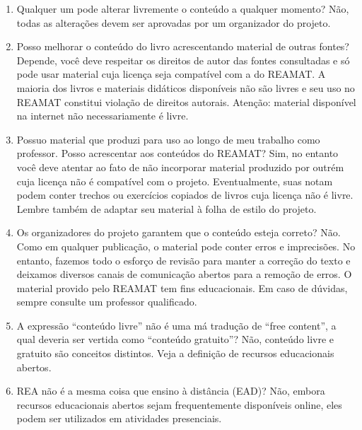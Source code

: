 \documentclass[12pt]{report}
\begin{document}
\begin{enumerate}
\item Qualquer um pode alterar livremente o conteúdo a qualquer momento?
Não, todas as alterações devem ser aprovadas por um organizador do projeto.

\item Posso melhorar o conteúdo do livro acrescentando material de outras fontes?
Depende, você deve respeitar os direitos de autor das fontes consultadas e só pode usar material cuja licença seja compatível com a do REAMAT. A maioria dos livros e materiais didáticos disponíveis não são livres e seu uso no REAMAT constitui violação de direitos autorais. Atenção: material disponível na internet não necessariamente é livre.

\item Possuo material que produzi para uso ao longo de meu trabalho como professor. Posso acrescentar aos conteúdos do REAMAT?
Sim, no entanto você deve atentar ao fato de não incorporar material produzido por outrém cuja licença não é compatível com o projeto. Eventualmente, suas notam podem conter trechos ou exercícios copiados de livros cuja licença não é livre. Lembre também de adaptar seu material à folha de estilo do projeto.

\item Os organizadores do projeto garantem que o conteúdo esteja correto?
Não. Como em qualquer publicação, o material pode conter erros e imprecisões. No entanto, fazemos todo o esforço de revisão para manter a correção do texto e deixamos diversos canais de comunicação abertos para a remoção de erros. O material provido pelo REAMAT tem fins educacionais. Em caso de dúvidas, sempre consulte um professor qualificado.

\item A expressão ``conteúdo livre'' não é uma má tradução de ``free content'', a qual deveria ser vertida como ``conteúdo gratuito''?
Não, conteúdo livre e gratuito são conceitos distintos. Veja a definição de recursos educacionais abertos.

\item REA não é a mesma coisa que ensino à distância (EAD)?
Não, embora recursos educacionais abertos sejam frequentemente disponíveis online, eles podem ser utilizados em atividades presenciais.
\end{enumerate}
\end{document}
